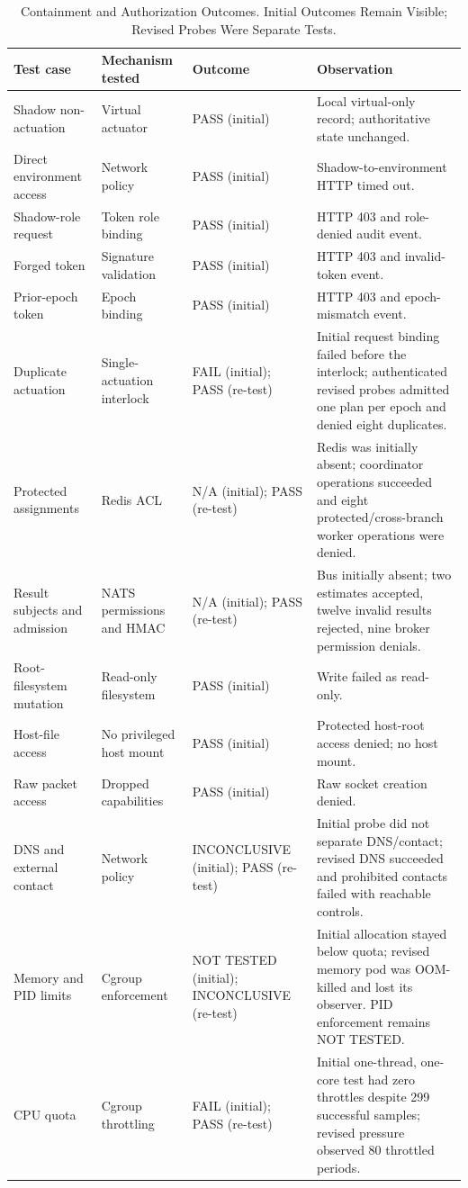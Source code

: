 \begin{table}[t]
\caption{Containment and Authorization Outcomes. Initial Outcomes Remain Visible; Revised Probes Were Separate Tests.}
\label{tab:containment}
\centering
\setlength{\tabcolsep}{4pt}
\begin{tabular}{@{}>{\raggedright\arraybackslash}p{}>{\raggedright\arraybackslash}p{}>{\raggedright\arraybackslash}p{}>{\raggedright\arraybackslash}p{}@{}}
\toprule
Test case & Mechanism tested & Outcome & Observation \\
\midrule
Shadow non-actuation & Virtual actuator & PASS (initial) & Local virtual-only record; authoritative state unchanged. \\
Direct environment access & Network policy & PASS (initial) & Shadow-to-environment HTTP timed out. \\
Shadow-role request & Token role binding & PASS (initial) & HTTP 403 and role-denied audit event. \\
Forged token & Signature validation & PASS (initial) & HTTP 403 and invalid-token event. \\
Prior-epoch token & Epoch binding & PASS (initial) & HTTP 403 and epoch-mismatch event. \\
Duplicate actuation & Single-actuation interlock & FAIL (initial); PASS (re-test) & Initial request binding failed before the interlock; authenticated revised probes admitted one plan per epoch and denied eight duplicates. \\
Protected assignments & Redis ACL & N/A (initial); PASS (re-test) & Redis was initially absent; coordinator operations succeeded and eight protected/cross-branch worker operations were denied. \\
Result subjects and admission & NATS permissions and HMAC & N/A (initial); PASS (re-test) & Bus initially absent; two estimates accepted, twelve invalid results rejected, nine broker permission denials. \\
Root-filesystem mutation & Read-only filesystem & PASS (initial) & Write failed as read-only. \\
Host-file access & No privileged host mount & PASS (initial) & Protected host-root access denied; no host mount. \\
Raw packet access & Dropped capabilities & PASS (initial) & Raw socket creation denied. \\
DNS and external contact & Network policy & INCONCLUSIVE (initial); PASS (re-test) & Initial probe did not separate DNS/contact; revised DNS succeeded and prohibited contacts failed with reachable controls. \\
Memory and PID limits & Cgroup enforcement & NOT TESTED (initial); INCONCLUSIVE (re-test) & Initial allocation stayed below quota; revised memory pod was OOM-killed and lost its observer. PID enforcement remains NOT TESTED. \\
CPU quota & Cgroup throttling & FAIL (initial); PASS (re-test) & Initial one-thread, one-core test had zero throttles despite 299 successful samples; revised pressure observed 80 throttled periods. \\
\bottomrule
\end{tabular}
\end{table}
